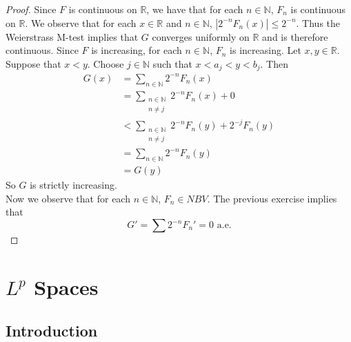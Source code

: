 \documentclass[12pt]{amsart}
\theoremstyle{definition}
\newcommand{\N}{\mathbb{N}}
\newcommand{\R}{\mathbb{R}}
\begin{document}
	\begin{proof}
		Since $F$ is continuous on $\R$, we have that for each $n \in \N$, $F_n$ is continuous on $\R$. We observe that for each $x \in \R$ and $n \in \N$, $|2^{-n}F_n(x)| \leq 2^{-n}$. Thus the Weierstrass M-test implies that $G$ converges uniformly on $\R$ and is therefore continuous. Since $F$ is increasing, for each $n \in \N$, $F_n$ is increasing. Let $x, y \in \R$. Suppose that $x<y$. Choose $j \in \N$ such that $x<a_j<y<b_j$. Then 
		\begin{align*}
			G(x) 
			&= \sum_{n \in \N}2^{-n}F_n(x)\\
			&= \sum_{\substack{n \in \N\\ n \neq j}}2^{-n}F_n(x) + 0\\
			& < \sum_{\substack{n \in \N\\ n \neq j}}2^{-n}F_n(y) + 2^{-j}F_n(y)\\
			&=\sum_{n \in \N}2^{-n}F_n(y)\\
			&=G(y)
		\end{align*}
		So $G$ is strictly increasing.\\
		Now we observe that for each $n \in \N$, $F_n \in NBV$. The previous exercise implies that $$G' = \sum 2^{-n}F_n'=0 \text{ a.e.}$$
	\end{proof}
	
	
	
	
	
	
	
	
	
	
	
	
	
	
	
	
	
	
	
	
	
	
	
	
	
	
	
	
	
	
	
	
	
	
	
	
	
	
	
	
	\newpage
	\section{$L^{p}$ Spaces}
	
	\subsection{Introduction}
	
\end{document}
